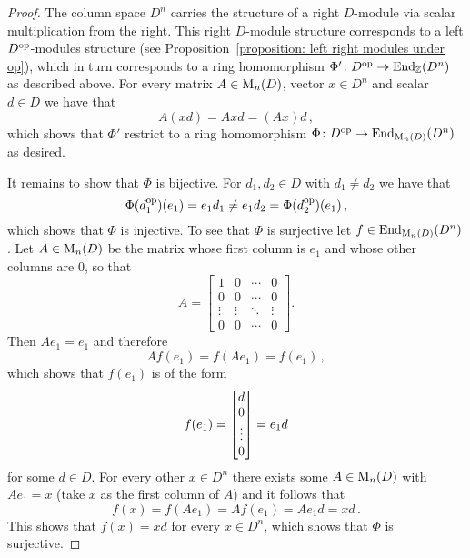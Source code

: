 \begin{proof}
  
  The column space $D^n$ carries the structure of a right $D$-module via scalar multiplication from the right.
  This right $D$-module structure corresponds to a left $D^{\operatorname{op}}$-modules structure (see Proposition~\ref{proposition: left right modules under op}), which in turn corresponds to a ring homomorphism $\Phi' \colon D^{\operatorname{op}} \to \operatorname{End}_{\mathbb{Z}}(D^n)$ as described above.
  For every matrix $A \in \operatorname{M}_n(D)$, vector $x \in D^n$ and scalar $d \in D$ we have that
  \[
      A(xd)
    = Axd
    = (Ax)d \,,
  \]
  which shows that $\Phi'$ restrict to a ring homomorphism $\Phi \colon D^{\operatorname{op}} \to \operatorname{End}_{\operatorname{M}_n(D)}(D^n)$ as desired.
  
  It remains to show that $\Phi$ is bijective.
  For $d_1, d_2 \in D$ with $d_1 \neq d_2$ we have that
  \[
          \Phi(d_1^{\operatorname{op}})(e_1)
    =     e_1 d_1
    \neq  e_1 d_2
    =     \Phi(d_2^{\operatorname{op}})(e_1) \,,
  \]
  which shows that $\Phi$ is injective.
  To see that $\Phi$ is surjective let $f \in \operatorname{End}_{\operatorname{M}_n(D)}(D^n)$.
  Let $A \in \operatorname{M}_n(D)$ be the matrix whose first column is $e_1$ and whose other columns are $0$, so that
  \[
      A
    = \begin{bmatrix}
        1       & 0       & \cdots  & 0       \\
        0       & 0       & \cdots  & 0       \\
        \vdots  & \vdots  & \ddots  & \vdots  \\
        0       & 0       & \cdots  & 0
      \end{bmatrix}.
  \]
  Then $A e_1 = e_1$ and therefore
  \[
      A f(e_1)
    = f(A e_1)
    = f(e_1) \,,
  \]
  which shows that $f(e_1)$ is of the form
  \[
      f(e_1)
    = \begin{bmatrix}d \\ 0 \\ \vdots \\ 0\end{bmatrix}
    = e_1 d
  \]
  for some $d \in D$.
  For every other $x \in D^n$ there exists some $A \in \operatorname{M}_n(D)$ with $Ae_1 = x$ (take $x$ as the first column of $A$) and it follows that
  \[
      f(x)
    = f(A e_1)
    = A f(e_1)
    = A e_1 d
    = x d \,.
  \]
  This shows that $f(x) = xd$ for every $x \in D^n$, which shows that $\Phi$ is surjective.
\end{proof}


